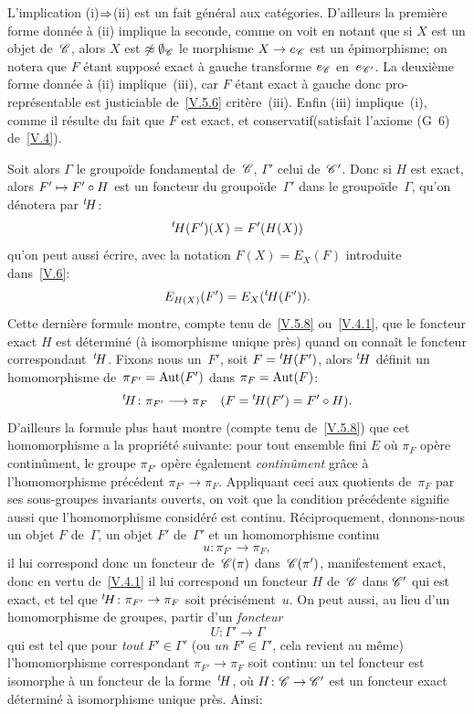 L'implication (i)$\To$(ii) est un fait g\'en\'eral aux
cat\'egories. D'ailleurs la premi\`ere forme donn\'ee \`a (ii)
implique la seconde, comme on voit en notant que si $X$ est un objet
de~$\cal{C}$, alors $X$ est $\not\approx \emptyset_{\cal{C}}$ \sss le
morphisme $X\to e_{\cal{C}}$ est un \'epimorphisme; on notera que
$F$ \'etant suppos\'e exact \`a gauche transforme $e_{\cal{C}}$
en~$e_{\cal{C'}}$. La deuxi\`eme forme donn\'ee \`a (ii)
implique~(iii), car $F$ \'etant exact \`a gauche donc
pro-repr\'esentable est justiciable de~\ref{V.5.6}
crit\`ere~(iii). Enfin (iii) implique~(i), comme il r\'esulte du
fait que $F$ est exact, et \og conservatif\fg (\ie satisfait l'axiome
(G~6) de~\no \ref{V.4}).

Soit alors $\Gamma$ le groupo\"ide fondamental de~$\cal{C}$,
$\Gamma'$ celui de~$\cal{C'}$. Donc si
$H$ est exact, alors $F' \mto F' \circ H$ est un foncteur du
groupo\"ide~$\Gamma'$ dans le groupo\"ide~$\Gamma$, qu'on
d\'enotera par ${}^t\!H$:
$$
{}^t\!H (F')(X)=F' (H(X))
$$
qu'on peut aussi \'ecrire, avec la notation $F(X)=E_X (F)$
introduite dans~\no \ref{V.6}:
$$
E_{H(X)} (F')=E_X ({}^t\!H(F')).
$$
Cette derni\`ere formule montre, compte tenu de~\ref{V.5.8}
ou~\ref{V.4.1}, que le foncteur exact $H$ est d\'etermin\'e (\`a
isomorphisme unique pr\`es) quand on conna\^it le foncteur
correspondant~${}^t\!H$. Fixons nous un~$F'$, soit $F={}^t\!H (F')$,
alors ${}^t\!H$ d\'efinit un homomorphisme de~$\pi_{F'} =\operatorname{Aut}(F')$
dans $\pi_F =\operatorname{Aut}(F)$:
$$
\tH\colon \pi_{F'} \to \pi_F \quad (F=\tH (F')=F' \circ H).
$$
D'ailleurs la formule plus haut montre (compte tenu de~\ref{V.5.8})
que cet homomorphisme a la propri\'et\'e suivante: pour tout
ensemble fini $E$ o\`u $\pi_F$ op\`ere contin\^ument, le groupe
$\pi_{F'}$ op\`ere \'egalement \emph{continûment} gr\^ace
\`a l'homomorphisme pr\'ec\'edent $\pi_{F'} \to
\pi_F$. \hbox{Appliquant} ceci aux quotients de~$\pi_F$ par ses sous-groupes
invariants ouverts, on voit que la condition pr\'ec\'edente
signifie aussi que l'homomorphisme consid\'er\'e est
continu. R\'eciproquement,
donnons-nous
un objet $F$ de~$\Gamma$, un
objet $F'$ de~$\Gamma'$ et un homomorphisme continu
$$
u\colon \pi_{F'} \to \pi_F ,
$$
il lui correspond donc un foncteur de~$\cal{C} (\pi)$
dans~$\cal{C}(\pi')$, manifestement exact, donc en vertu
de~\ref{V.4.1} il lui correspond un foncteur $H$ de~$\cal{C}$ dans
$\cal{C'}$ qui est exact, et tel que $\tH\colon \pi_{F'} \to \pi_F$
soit pr\'ecis\'ement~$u$. On peut aussi, au lieu d'un
homomorphisme de groupes, partir d'un \emph{foncteur}
$$
U\colon \Gamma' \to \Gamma
$$
qui est tel que pour \emph{tout} $F' \in \Gamma'$ (ou \emph{un} $F'
\in \Gamma'$, cela revient au m\^eme) l'homomorphisme correspondant
$\pi_{F'} \to \pi_F$ soit continu: un tel foncteur est isomorphe \`a
un foncteur de la forme~${}^t\!H$, o\`u $H\colon \cal{C} \to
\cal{C'}$ est un foncteur exact d\'etermin\'e \`a isomorphisme
unique pr\`es. Ainsi:

